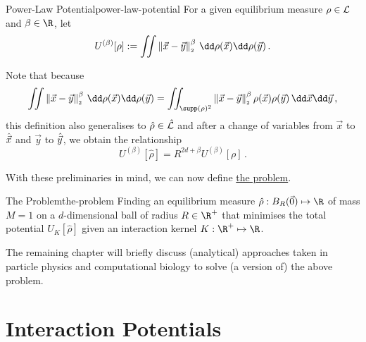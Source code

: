 \begin{definition}{Power-Law Potential}{power-law-potential}
  For a given equilibrium measure $\rho \in \mathcal{L}$ and $\beta \in \R$, let
  $$U^{(\beta)}[\rho] := \iint \norm{\vec{x}-\vec{y}}^\beta \,\dd\rho(\vec{x})\dd\rho(\vec{y})\,.$$
\end{definition}

Note that because
$$\iint \norm{\vec{x}-\vec{y}}^\beta \,\dd\rho(\vec{x})\dd\rho(\vec{y}) = \iint_{\supp(\rho)^2} \norm{\vec{x}-\vec{y}}^\beta \rho(\vec{x}) \rho(\vec{y}) \,\dd\vec{x}\dd\vec{y}\,,$$
this definition also generalises to $\hat{\rho} \in \hat{\mathcal{L}}$ and after a change of variables from $\vec{x}$ to $\hat{\vec{x}}$ and $\vec{y}$ to $\hat{\vec{y}}$, we obtain the relationship
$$U^{(\beta)}[\hat{\rho}] = R^{2d + \beta} U^{(\beta)}[\rho]\,.$$

With these preliminaries in mind, we can now define \href{def:the-problem}{the problem}.

\begin{definition}[colframe=gray, colbacktitle=gray!30]{The Problem}{the-problem}
  Finding an equilibrium measure $\hat{\rho}: B_R(\vec{0}) \mapsto \R$ of mass $M = 1$ on a $d$-dimensional ball of radius $R \in \R^+$ that minimises the total potential $U_K[\hat{\rho}]$ given an interaction kernel $K: \R^+ \mapsto \R$.
\end{definition}

The remaining chapter will briefly discuss (analytical) approaches taken in particle physics and computational biology to solve (a version of) the above problem.

\section{Interaction Potentials}
